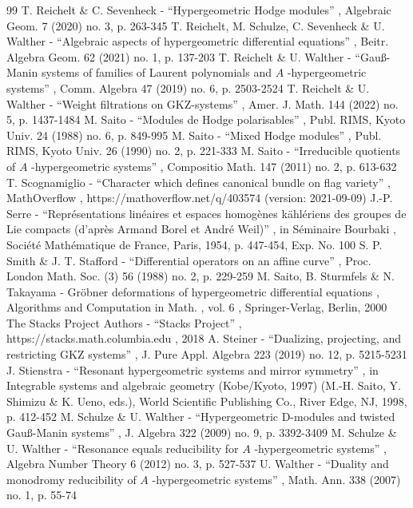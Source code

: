 \documentclass[11pt]{article}
\begin{document}
\begin{thebibliography}{99}
 T. Reichelt \& C. Sevenheck - “Hypergeometric Hodge modules” , Algebraic Geom. 7 (2020) no. 3, p. 263-345
 T. Reichelt, M. Schulze, C. Sevenheck \& U. Walther - “Algebraic aspects of hypergeometric differential equations” , Beitr. Algebra Geom. 62 (2021) no. 1, p. 137-203
 T. Reichelt \& U. Walther - “Gauß-Manin systems of families of Laurent polynomials and $A$ -hypergeometric systems” , Comm. Algebra 47 (2019) no. 6, p. 2503-2524
 T. Reichelt \& U. Walther - “Weight filtrations on GKZ-systems” , Amer. J. Math. 144 (2022) no. 5, p. 1437-1484
 M. Saito - “Modules de Hodge polarisables” , Publ. RIMS, Kyoto Univ. 24 (1988) no. 6, p. 849-995
 M. Saito - “Mixed Hodge modules” , Publ. RIMS, Kyoto Univ. 26 (1990) no. 2, p. 221-333
 M. Saito - “Irreducible quotients of $A$ -hypergeometric systems” , Compositio Math. 147 (2011) no. 2, p. 613-632
 T. Scognamiglio - “Character which defines canonical bundle on flag variety” , MathOverflow , https://mathoverflow.net/q/403574 (version: 2021-09-09)
 J.-P. Serre - “Représentations linéaires et espaces homogènes kählériens des groupes de Lie compacts (d’après Armand Borel et André Weil)” , in Séminaire Bourbaki , Société Mathématique de France, Paris, 1954, p. 447-454, Exp. No. 100
 S. P. Smith \& J. T. Stafford - “Differential operators on an affine curve” , Proc. London Math. Soc. (3) 56 (1988) no. 2, p. 229-259
 M. Saito, B. Sturmfels \& N. Takayama - Gröbner deformations of hypergeometric differential equations , Algorithms and Computation in Math. , vol. 6 , Springer-Verlag, Berlin, 2000
 The Stacks Project Authors - “Stacks Project” , https://stacks.math.columbia.edu , 2018
 A. Steiner - “Dualizing, projecting, and restricting GKZ systems” , J. Pure Appl. Algebra 223 (2019) no. 12, p. 5215-5231
 J. Stienstra - “Resonant hypergeometric systems and mirror symmetry” , in Integrable systems and algebraic geometry (Kobe/Kyoto, 1997) (M.-H. Saito, Y. Shimizu \& K. Ueno, eds.), World Scientific Publishing Co., River Edge, NJ, 1998, p. 412-452
 M. Schulze \& U. Walther - “Hypergeometric D-modules and twisted Gauß-Manin systems” , J. Algebra 322 (2009) no. 9, p. 3392-3409
 M. Schulze \& U. Walther - “Resonance equals reducibility for $A$ -hypergeometric systems” , Algebra Number Theory 6 (2012) no. 3, p. 527-537
 U. Walther - “Duality and monodromy reducibility of $A$ -hypergeometric systems” , Math. Ann. 338 (2007) no. 1, p. 55-74
\end{thebibliography}
\end{document}
